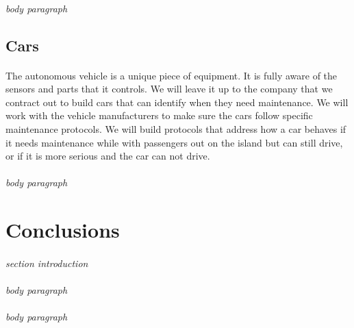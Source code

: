 \documentclass[12pt]{article}
\begin{document}
    \paragraph{} \textit{body paragraph}

    \subsection{Cars}
    \paragraph{} The autonomous vehicle is a unique piece of equipment. It is fully 
    aware of the sensors and parts that it controls. We will leave it up to the 
    company that we contract out to build cars that can identify when they need 
    maintenance. We will work with the vehicle manufacturers to make sure the cars 
    follow specific maintenance protocols. We will build protocols that address how 
    a car behaves if it needs maintenance while with passengers out on the island but 
    can still drive, or if it is more serious and the car can not drive.
    
    \paragraph{} \textit{body paragraph}
    
\section{Conclusions}
\paragraph{} \textit{section introduction} 
\paragraph{} \textit{body paragraph}
\paragraph{} \textit{body paragraph}
\pagebreak

\end{document}
